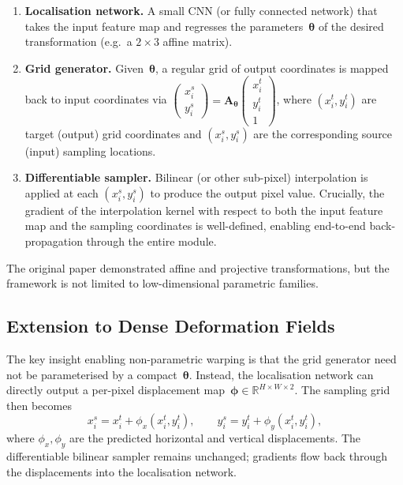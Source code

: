 \begin{enumerate}
    \item \textbf{Localisation network.}  A small CNN (or fully
          connected network) that takes the input feature map and
          regresses the parameters~$\boldsymbol{\theta}$ of the desired
          transformation (e.g.\ a $2 \times 3$ affine matrix).
    \item \textbf{Grid generator.}  Given~$\boldsymbol{\theta}$, a
          regular grid of output coordinates is mapped back to input
          coordinates via $\begin{pmatrix} x_i^s \\ y_i^s
          \end{pmatrix} = \mathbf{A}_{\boldsymbol{\theta}}
          \begin{pmatrix} x_i^t \\ y_i^t \\ 1 \end{pmatrix}$, where
          $(x_i^t, y_i^t)$ are target (output) grid coordinates and
          $(x_i^s, y_i^s)$ are the corresponding source (input)
          sampling locations.
    \item \textbf{Differentiable sampler.}  Bilinear (or other
          sub-pixel) interpolation is applied at each $(x_i^s, y_i^s)$
          to produce the output pixel value.  Crucially, the gradient of
          the interpolation kernel with respect to both the input feature
          map and the sampling coordinates is well-defined, enabling
          end-to-end back-propagation through the entire module.
\end{enumerate}

The original paper demonstrated affine and projective transformations,
but the framework is not limited to low-dimensional parametric
families.

\subsection{Extension to Dense Deformation Fields}

The key insight enabling non-parametric warping is that the grid
generator need not be parameterised by a compact~$\boldsymbol{\theta}$.
Instead, the localisation network can directly output a per-pixel
displacement map~$\boldsymbol{\phi} \in \mathbb{R}^{H \times W \times
2}$.  The sampling grid then becomes
\[
    x_i^s = x_i^t + \phi_x(x_i^t, y_i^t), \qquad
    y_i^s = y_i^t + \phi_y(x_i^t, y_i^t),
\]
where $\phi_x, \phi_y$ are the predicted horizontal and vertical
displacements.  The differentiable bilinear sampler remains unchanged;
gradients flow back through the displacements into the localisation
network.

